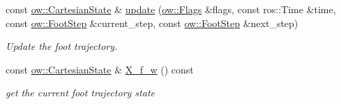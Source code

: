 \begin{DoxyCompactItemize}
\item 
const \hyperlink{classow__core_1_1CartesianState}{ow\+::\+Cartesian\+State} \& \hyperlink{classow__ftg_1_1SingleFootTrajectoryGenerator_a541ed3fcbfc0aa4411c16f1226c0ebf3}{update} (\hyperlink{classow__core_1_1Flags}{ow\+::\+Flags} \&flags, const ros\+::\+Time \&time, const \hyperlink{classow__core_1_1FootStep}{ow\+::\+Foot\+Step} \&current\+\_\+step, const \hyperlink{classow__core_1_1FootStep}{ow\+::\+Foot\+Step} \&next\+\_\+step)
\begin{DoxyCompactList}\small\item\em Update the foot trajectory. \end{DoxyCompactList}\item 
const \hyperlink{classow__core_1_1CartesianState}{ow\+::\+Cartesian\+State} \& \hyperlink{classow__ftg_1_1SingleFootTrajectoryGenerator_a5f5262234fee794aa42c40abd255e292}{X\+\_\+f\+\_\+w} () const 
\begin{DoxyCompactList}\small\item\em get the current foot trajectory state \end{DoxyCompactList}\end{DoxyCompactItemize}
